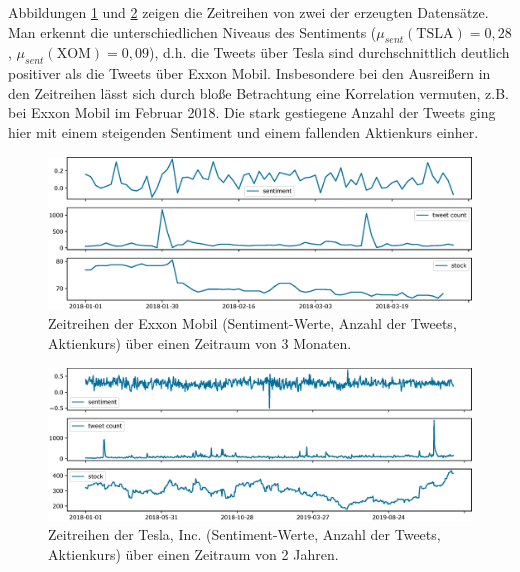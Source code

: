 \documentclass[
	a4paper,
	12pt,
	bibliography=totocnumbered,
	twoside,
]{scrreprt}
\begin{document}
Abbildungen \ref{fig:timeseries-xom} und \ref{fig:timeseries-tsla} zeigen die Zeitreihen von zwei der erzeugten Datensätze. Man erkennt die unterschiedlichen Niveaus des Sentiments ($\mu_{sent}(\text{TSLA}) = 0,28$, $\mu_{sent}(\text{XOM}) = 0,09$), d.h. die Tweets über Tesla sind durchschnittlich deutlich positiver als die Tweets über Exxon Mobil.
Insbesondere bei den Ausreißern in den Zeitreihen lässt sich durch bloße Betrachtung eine Korrelation vermuten, z.B. bei Exxon Mobil im Februar 2018. Die stark gestiegene Anzahl der Tweets ging hier mit einem steigenden Sentiment und einem fallenden Aktienkurs einher.\\


\begin{figure}[hbt!]
    \centering
    \includegraphics[width=\textwidth]{images/timeseries_XOM_3M.eps}
    \caption[Zeitreihen der Exxon Mobil, 3 Monate]{Zeitreihen der Exxon Mobil (Sentiment-Werte, Anzahl der Tweets, Aktienkurs) über einen Zeitraum von 3 Monaten\footnotemark.}
    \label{fig:timeseries-xom}
\end{figure}


\begin{figure}[hbt!]
    \centering
    \includegraphics[width=\textwidth]{images/timeseries_TSLA_2Y.eps}
    \caption[Zeitreihen der Tesla, Inc., 2 Jahre]{Zeitreihen der Tesla, Inc. (Sentiment-Werte, Anzahl der Tweets, Aktienkurs) über einen Zeitraum von 2 Jahren.\footnotemark}
    \label{fig:timeseries-tsla}
\end{figure}
\end{document}
